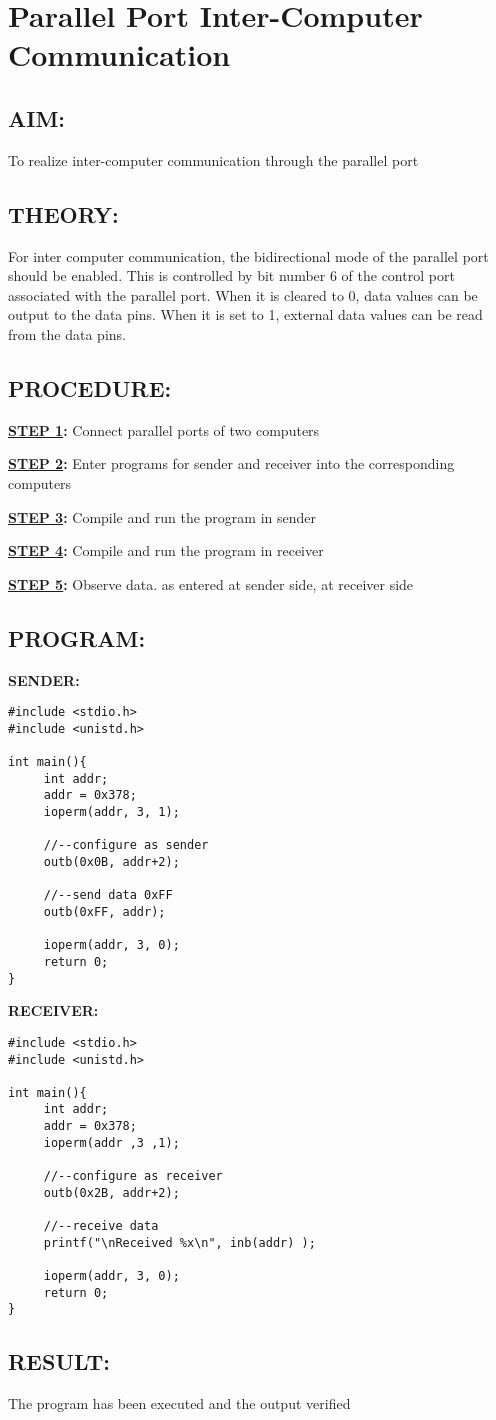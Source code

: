 \chapter{Parallel Port Inter-Computer Communication}
%
%
%
%
\section*{AIM:}
To realize inter-computer communication through the parallel port
\section*{THEORY:}
For inter computer communication, the bidirectional mode of the parallel port should be enabled. This is controlled by bit number 6 of the control port associated with the parallel port. When it is cleared to 0, data values can be output to the data pins. When it is set to 1, external data values can be read from the data pins.
\section*{PROCEDURE:}
\textbf{\underline{STEP 1}:} Connect parallel ports of two computers

\textbf{\underline{STEP 2}:} Enter programs for sender and receiver into the corresponding computers

\textbf{\underline{STEP 3}:} Compile and run the program in sender

\textbf{\underline{STEP 4}:} Compile and run the program in receiver

\textbf{\underline{STEP 5}:} Observe data. as entered at sender side, at receiver side

\section*{PROGRAM:}
\textbf{SENDER:}
\begin{lstlisting}
#include <stdio.h>
#include <unistd.h>

int main(){
     int addr;
     addr = 0x378;
     ioperm(addr, 3, 1);
     
     //--configure as sender
     outb(0x0B, addr+2);
     
     //--send data 0xFF
     outb(0xFF, addr);
     
     ioperm(addr, 3, 0);
     return 0;
}
\end{lstlisting}

\vspace{20pt}
\textbf{RECEIVER:}
\begin{lstlisting}
#include <stdio.h>
#include <unistd.h>

int main(){
     int addr;
     addr = 0x378;
     ioperm(addr ,3 ,1);
     
     //--configure as receiver
     outb(0x2B, addr+2);
     
     //--receive data
     printf("\nReceived %x\n", inb(addr) );
     
     ioperm(addr, 3, 0);
     return 0;
}
\end{lstlisting}

\section*{RESULT:}
The program has been executed and the output verified
%
%
%
%
